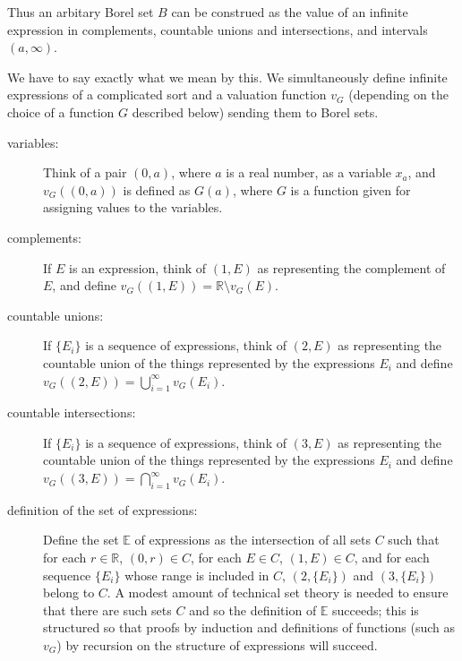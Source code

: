 \documentclass[12pt]{article}
\begin{document}
Thus an arbitary Borel set $B$ can be construed as the value of an infinite expression in complements, countable unions and intersections, and intervals $(a,\infty)$.

We have to say exactly what we mean by this.  We simultaneously define infinite expressions of a complicated sort and a valuation function $v_G$ (depending on the choice of a function $G$ described below) sending them to
Borel sets.

\begin{description}

\item[variables:]  Think of a pair $(0,a)$, where $a$ is a real number, as a variable $x_a$, and $v_G((0,a))$ is defined as $G(a)$, where $G$ is a function given for assigning values to the variables.

\item[complements:]  If $E$ is an expression, think of $(1,E)$ as representing the complement of $E$, and define $v_G((1,E)) = \mathbb R \setminus v_G(E)$.

\item[countable unions:]  If $\{E_i\}$ is a sequence of expressions, think of $(2,E)$ as representing the countable union of the things represented by the expressions $E_i$
and define $v_G((2,E)) = \bigcup_{i=1}^\infty v_G(E_i)$.

\item[countable intersections:]  If $\{E_i\}$ is a sequence of expressions, think of $(3,E)$ as representing the countable union of the things represented by the expressions $E_i$
and define $v_G((3,E)) = \bigcap_{i=1}^\infty v_G(E_i)$.

\item[definition of the set of expressions:]  Define the set $\mathbb E$ of expressions as the intersection of all sets $C$ such that for each $r \in \mathbb R$,
$(0,r) \in C$, for each $E \in C$, $(1,E) \in C$, and for each sequence $\{E_i\}$ whose range is included in $C$, $(2,\{E_i\})$ and $(3,\{E_i\})$ belong to $C$.  A modest amount of technical set theory is needed to ensure that there are such sets $C$ and so the definition of $\mathbb E$ succeeds;  this is structured so that proofs by induction and definitions of functions
(such as $v_G$) by recursion on the structure of expressions will succeed.


\end{description}
\end{document}
